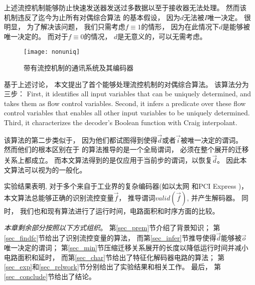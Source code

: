 上述流控机制能够防止快速发送器发送过多数据以至于接收器无法处理。
然而该机制违反了迄今为止所有对偶综合算法
的基本假设，
因为$d$无法被$I$唯一决定。
很明显，
为了解决该问题，
我们只需考虑$f\equiv 1$的情形，
因为在此情况下$d$是能够被唯一决定的。
而对于$f\equiv 0$的情况，
$d$是无意义的，可以无需考虑。

\begin{figure}
\centerline{\texttt{[image: nonuniq]}}
\caption{带有流控机制的通讯系统及其编码器}
\label{fig:nonuniq}
\end{figure}


基于上述讨论，
本文提出了首个能够处理流控机制的对偶综合算法。
该算法分为三步：
First,
it identifies all input variables that can be uniquely determined,
and takes them as flow control variables.
Second,
it infers a predicate over these flow control variables
that enables all other input variables to be uniquely determined.
Third,
it characterizes the decoder's Boolean function with Craig interpolant.


该算法的第二步类似于，
因为他们都试图得到使得$\vec{d}$或者$\vec{i}$被唯一决定的谓词。
然而他们的根本区别在于
的算法推导的是一个全局谓词，
必须在整个展开的迁移关系上都成立。
而本文算法得到的是仅应用于当前步的谓词，以恢复$\vec{d}$。
因此本文算法可以视为的一般化。

实验结果表明,
对于多个来自于工业界的复杂编码器(如以太网 和PCI Express )，
本文算法总能够正确的识别流控变量$\vec{f}$，
推导谓词$valid(\vec{f})$,
并产生解码器。
同时，
我们也和现有算法进行了运行时间，电路面积和时序方面的比较。



\emph{本章剩余部分按照以下方式组织}。
第\ref{sec_prem}节介绍了背景知识；
第\ref{sec_findfc}节给出了识别流控变量的算法，
而第\ref{sec_infer}节推导使得$\vec{d}$能够被$\vec{o}$唯一决定的谓词；
第\ref{sec_min}节压缩迁移关系展开的长度以降低运行时间并减小电路面积和延时，
而第\ref{sec_char}节给出了特征化解码器电路的算法；
第\ref{sec_exp}和\ref{sec_relwork}节分别给出了实验结果和相关工作。
最后，
第\ref{sec_conclude}节给出了结论。



